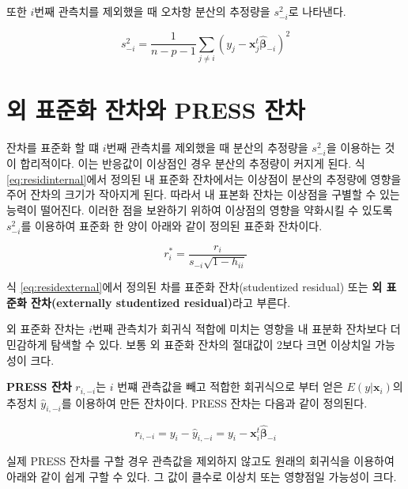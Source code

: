 \documentclass[
  10pt,
]{book}
\theoremstyle{definition}
\theoremstyle{definition}
\theoremstyle{definition}
\theoremstyle{definition}
\theoremstyle{remark}
\begin{document}
또한 \(i\)번째 관측치를 제외했을 때 오차항 분산의 추정량을 \(s^2_{-i}\)로
나타낸다.

\begin{equation}
 s^2_{-i} = \frac{1}{n-p-1} \sum_{j \ne i} (y_j - {\bm x}_j^t \hat{ \bm \beta}_{-i} )^2 
\label{eq:s2minusi}
\end{equation}

\hypertarget{uxc678-uxd45cuxc900uxd654-uxc794uxcc28uxc640-press-uxc794uxcc28}{%
\section{외 표준화 잔차와 PRESS 잔차}\label{uxc678-uxd45cuxc900uxd654-uxc794uxcc28uxc640-press-uxc794uxcc28}}

잔차를 표준화 할 떄 \(i\)번째 관측치를 제외했을 때 분산의 추정량을
\(s^2_{-i}\)을 이용하는 것이 합리적이다. 이는 반응값이 이상점인 경우
분산의 추정량이 커지게 된다. 식 \eqref{eq:residinternal}에서 정의된 내
표준화 잔차에서는 이상점이 분산의 추정량에 영향을 주어 잔차의 크기가
작아지게 된다. 따라서 내 표본화 잔차는 이상점을 구별할 수 있는 능력이
떨어진다. 이러한 점을 보완하기 위하여 이상점의 영향을 약화시킬 수 있도록
\(s^2_{-i}\)를 이용하여 표준화 한 양이 아래와 같이 정의된 표준화 잔차이다.

\begin{equation}
r^*_i = \frac{r_i}{s_{-i} \sqrt{1-h_{ii}}} 
\label{eq:residexternal}
\end{equation}

식 \eqref{eq:residexternal}에서 정의된 차를 표준화 잔차(studentized
residual) 또는 \textbf{외 표준화 잔차(externally studentized residual)}라고
부른다.

외 표준화 잔차는 \(i\)번째 관측치가 회귀식 적합에 미치는 영향을 내 표분화
잔차보다 더 민감하게 탐색할 수 있다. 보통 외 표준화 잔차의 절대값이
2보다 크면 이상치일 가능성이 크다.

\textbf{PRESS 잔차} \(r_{i,-i}\)는 \(i\) 번쨰 관측값을 빼고 적합한 회귀식으로
부터 얻은 \(E(y| \bm x_i)\)의 추정치 \(\hat y_{i,-i}\)를 이용하여 만든
잔차이다. PRESS 잔차는 다음과 같이 정의된다.

\begin{equation}
r_{i,-i}  =   y_i - \hat y_{i,-i} = y_i - \bm x^t_i \hat{ \bm \beta}_{-i} 
\label{eq:residpress}
\end{equation}

실제 PRESS 잔차를 구할 경우 관측값을 제외하지 않고도 원래의 회귀식을
이용하여 아래와 같이 쉽게 구할 수 있다. 그 값이 클수로 이상치 또는
영향점일 가능성이 크다.
\end{document}
